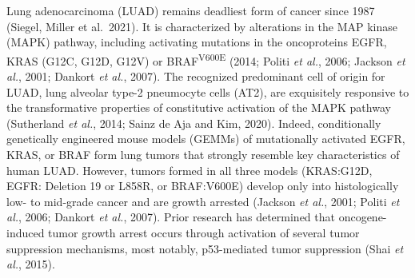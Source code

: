 Lung adenocarcinoma (LUAD) remains deadliest form of cancer since 1987 (Siegel, Miller et al.~2021). It is characterized by alterations in the MAP kinase (MAPK) pathway, including activating mutations in the oncoproteins EGFR, KRAS (G12C, G12D, G12V) or BRAF\textsuperscript{V600E} (2014; Politi \emph{et al.}, 2006; Jackson \emph{et al.}, 2001; Dankort \emph{et al.}, 2007). The recognized predominant cell of origin for LUAD, lung alveolar type-2 pneumocyte cells (AT2), are exquisitely responsive to the transformative properties of constitutive activation of the MAPK pathway (Sutherland \emph{et al.}, 2014; Sainz de Aja and Kim, 2020). Indeed, conditionally genetically engineered mouse models (GEMMs) of mutationally activated EGFR, KRAS, or BRAF form lung tumors that strongly resemble key characteristics of human LUAD. However, tumors formed in all three models (KRAS:G12D, EGFR: Deletion 19 or L858R, or BRAF:V600E) develop only into histologically low- to mid-grade cancer and are growth arrested (Jackson \emph{et al.}, 2001; Politi \emph{et al.}, 2006; Dankort \emph{et al.}, 2007). Prior research has determined that oncogene-induced tumor growth arrest occurs through activation of several tumor suppression mechanisms, most notably, p53-mediated tumor suppression (Shai \emph{et al.}, 2015).

